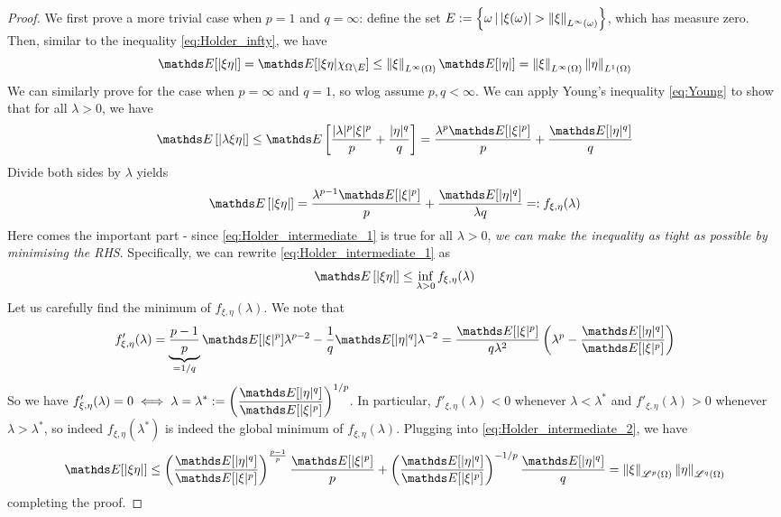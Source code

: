 \begin{unexaminable}
\begin{proof}
We first prove a more trivial case when $p = 1$ and $q = \infty$: define the set $E := \left\{ \omega \,|\, |\xi(\omega)| > \left\| \xi \right\|_{L^\infty(\omega)} \right \}$, which has measure zero. Then, similar to the inequality \eqref{eq:Holder_infty}, we have
\begin{equation}
    \E[|\xi \eta|] = \E[|\xi \eta| \chi_{\Omega \setminus E}] \leq \norm{\xi}_{L^\infty(\Omega)} \E[|\eta|] = \norm{\xi}_{L^\infty(\Omega)} \norm{\eta}_{L^1(\Omega)}
\end{equation}
We can similarly prove for the case when $p = \infty$ and $q = 1$, so wlog assume $p,q < \infty$. We can apply Young's inequality \eqref{eq:Young} to show that for all $\lambda > 0$, we have
\begin{align*}
    \E\sqbracket{|\lambda \xi \eta|} \leq \E\sqbracket{\frac{|\lambda|^p |\xi|^p}{p} + \frac{|\eta|^q}{q}} = \frac{\lambda^p \E[|\xi|^p]}{p} + \frac{\E[|\eta|^q]}{q}
\end{align*}
Divide both sides by $\lambda$ yields
\begin{align} \label{eq:Holder_intermediate_1}
    \E\sqbracket{|\xi \eta|} = \frac{\lambda^{p-1} \E[|\xi|^p]}{p} + \frac{\E[|\eta|^q]}{\lambda q} =: f_{\xi, \eta}(\lambda)
\end{align}
Here comes the important part - since \eqref{eq:Holder_intermediate_1} is true for all $\lambda > 0$, \textit{we can make the inequality as tight as possible by minimising the RHS}. Specifically, we can rewrite \eqref{eq:Holder_intermediate_1} as
\begin{align}
    \E\sqbracket{|\xi \eta|} \leq \inf_{\lambda > 0} f_{\xi, \eta}(\lambda)
\end{align}
Let us carefully find the minimum of $f_{\xi,\eta}(\lambda)$. We note that 
\begin{equation} \label{eq:Holder_intermediate_2}
    f'_{\xi,\eta}(\lambda) = \underbrace{\frac{p-1}{p}}_{=1/q}  \E[|\xi|^p] \lambda^{p-2} - \frac{1}{q} \E[|\eta|^q] \lambda^{-2} = \frac{\E[|\xi|^p]}{q\lambda^2} \bracket{\lambda^p - \frac{\E[|\eta|^q]}{\E[|\xi|^p]}} 
\end{equation}
So we have $\displaystyle{f'_{\xi,\eta}(\lambda) = 0 \iff \lambda = \lambda^* := \bracket{\frac{\E[|\eta|^q]}{\E[|\xi|^p]}}^{1/p}}$. In particular, $f'_{\xi, \eta}(\lambda) < 0$ whenever $\lambda < \lambda^*$ and $f'_{\xi, \eta}(\lambda) > 0$ whenever $\lambda > \lambda^*$, so indeed $f_{\xi,\eta}(\lambda^*)$ is indeed the global minimum of $f_{\xi,\eta}(\lambda)$. Plugging into \eqref{eq:Holder_intermediate_2}, we have
\begin{equation}
    \E[|\xi \eta|] \leq \bracket{\frac{\E[|\eta|^q]}{\E[|\xi|^p]}}^{\frac{p-1}{p}} \frac{\E[|\xi|^p]}{p} + \bracket{\frac{\E[|\eta|^q]}{\E[|\xi|^p]}}^{-1/p} \frac{\E[|\eta|^q]}{q} =  \norm{\xi}_{\L^p(\Omega)} \norm{\eta}_{\L^q(\Omega)}
\end{equation}
completing the proof.
\end{proof}


\end{unexaminable}
